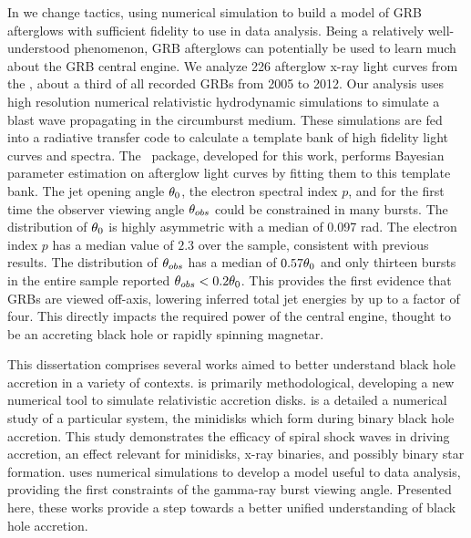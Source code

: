 In  we change tactics, using numerical simulation to build a model of GRB afterglows with sufficient fidelity to use in data analysis.  Being a relatively well-understood phenomenon, GRB afterglows can potentially be used to learn much about the GRB central engine.  We analyze 226 afterglow x-ray light curves from the \swiftXRT, about a third of all recorded GRBs from 2005 to 2012.  Our analysis uses high resolution numerical relativistic hydrodynamic simulations to simulate a blast wave propagating in the circumburst medium.  These simulations are fed into a radiative transfer code to calculate a template bank of high fidelity light curves and spectra.  The \scalefit\ package, developed for this work, performs Bayesian parameter estimation on afterglow light curves by fitting them to this template bank.  The jet opening angle $\theta_0$, the electron spectral index $p$, and for the first time the observer viewing angle $\theta_{obs}$ could be constrained in many bursts.  The distribution of $\theta_0$ is highly asymmetric with a median of 0.097 rad. The electron index $p$ has a median value of $2.3$ over the sample, consistent with previous results.  The distribution of $\theta_{obs}$ has a median of $0.57 \theta_0$ and only thirteen bursts in the entire sample reported $\theta_{obs} < 0.2 \theta_0$.  This provides the first evidence that GRBs are viewed off-axis, lowering inferred total jet energies by up to a factor of four.  This directly impacts the required power of the central engine, thought to be an accreting black hole or rapidly spinning magnetar.


This dissertation comprises several works aimed to better understand black hole accretion in a variety of contexts.   is primarily methodological, developing a new numerical tool to simulate relativistic accretion disks.   is a detailed a numerical study of a particular system, the minidisks which form during binary black hole accretion.  This study demonstrates the efficacy of spiral shock waves in driving accretion, an effect relevant for minidisks, x-ray binaries, and possibly binary star formation.   uses numerical simulations to develop a model useful to data analysis, providing the first constraints of the gamma-ray burst viewing angle.  Presented here, these works provide a step towards a better unified understanding of black hole accretion.

